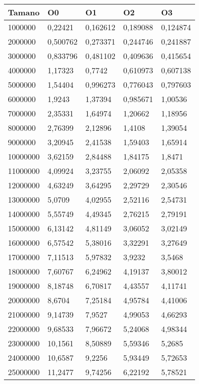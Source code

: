 \begin{tabular}{|l|l|l|l|l|}
	\hline
	Tamano & O0 & O1 & O2 & O3 \\
	\hline
	\hline
	1000000 & 0,22421 & 0,162612 & 0,189088 & 0,124874 \\
	\hline
	2000000 & 0,500762 & 0,273371 & 0,244746 & 0,241887 \\
	\hline
	3000000 & 0,833796 & 0,481102 & 0,409636 & 0,415654 \\
	\hline
	4000000 & 1,17323 & 0,7742 & 0,610973 & 0,607138 \\
	\hline
	5000000 & 1,54404 & 0,996273 & 0,776043 & 0,797603 \\
	\hline
	6000000 & 1,9243 & 1,37394 & 0,985671 & 1,00536 \\
	\hline
	7000000 & 2,35331 & 1,64974 & 1,20662 & 1,18956 \\
	\hline
	8000000 & 2,76399 & 2,12896 & 1,4108 & 1,39054 \\
	\hline
	9000000 & 3,20945 & 2,41538 & 1,59403 & 1,65914 \\
	\hline
	10000000 & 3,62159 & 2,84488 & 1,84175 & 1,8471 \\
	\hline
	11000000 & 4,09924 & 3,23755 & 2,06092 & 2,05358 \\
	\hline
	12000000 & 4,63249 & 3,64295 & 2,29729 & 2,30546 \\
	\hline
	13000000 & 5,0709 & 4,02955 & 2,52116 & 2,54731 \\
	\hline
	14000000 & 5,55749 & 4,49345 & 2,76215 & 2,79191 \\
	\hline
	15000000 & 6,13142 & 4,81149 & 3,06052 & 3,02149 \\
	\hline
	16000000 & 6,57542 & 5,38016 & 3,32291 & 3,27649 \\
	\hline
	17000000 & 7,11513 & 5,97832 & 3,9232 & 3,5468 \\
	\hline
	18000000 & 7,60767 & 6,24962 & 4,19137 & 3,80012 \\
	\hline
	19000000 & 8,18748 & 6,70817 & 4,43557 & 4,11741 \\
	\hline
	20000000 & 8,6704 & 7,25184 & 4,95784 & 4,41006 \\
	\hline
	21000000 & 9,14739 & 7,9527 & 4,99053 & 4,66293 \\
	\hline
	22000000 & 9,68533 & 7,96672 & 5,24068 & 4,98344 \\
	\hline
	23000000 & 10,1561 & 8,50889 & 5,59346 & 5,2685 \\
	\hline
	24000000 & 10,6587 & 9,2256 & 5,93449 & 5,72653 \\
	\hline
	25000000 & 11,2477 & 9,74256 & 6,22192 & 5,78521 \\
	\hline
\end{tabular}
